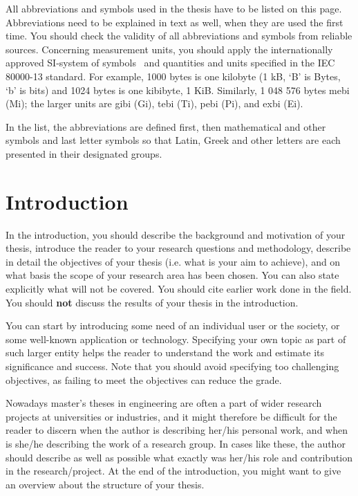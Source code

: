 All abbreviations and symbols used in the thesis have to be listed on this page. Abbreviations need to be explained in text as well, when they are used the first time. You should check the validity of all abbreviations and symbols from reliable sources. Concerning measurement units, you should apply the internationally approved SI-system of symbols~\cite{siopas, systemofunits} and quantities and units specified in the IEC 80000-13 standard. For example, 1000 bytes is one kilobyte (1 kB, `B' is Bytes, `b' is bits) and 1024 bytes is one kibibyte, 1 KiB. Similarly, 1 048 576 bytes mebi (Mi); the larger units are gibi (Gi), tebi (Ti), pebi (Pi), and exbi (Ei).

In the list, the abbreviations are defined first, then mathematical and other symbols and last letter symbols so that Latin, Greek and other letters are each presented in their designated groups. 

\section{Introduction}

In the introduction, you should describe the background and motivation of your thesis, introduce the reader to your research questions and methodology, describe in detail the objectives of your thesis (i.e. what is your aim to achieve), and on what basis the scope of your research area has been chosen. You can also state explicitly what will not be covered. You should cite earlier work done in the field. You should \textbf{not} discuss the results of your thesis in the introduction.

You can start by introducing some need of an individual user or the society, or some well-known application or technology. Specifying your own topic as part of such larger entity helps the reader to understand the work and estimate its significance and success. Note that you should avoid specifying too challenging objectives, as failing to meet the objectives can reduce the grade.

Nowadays master’s theses in engineering are often a part of wider research projects at universities or industries, and it might therefore be difficult for the reader to discern when the author is describing her/his personal work, and when is she/he describing the work of a research group. In cases like these, the author should describe as well as possible what exactly was her/his role and contribution in the research/project. At the end of the introduction, you might want to give an overview about the structure of your thesis.


